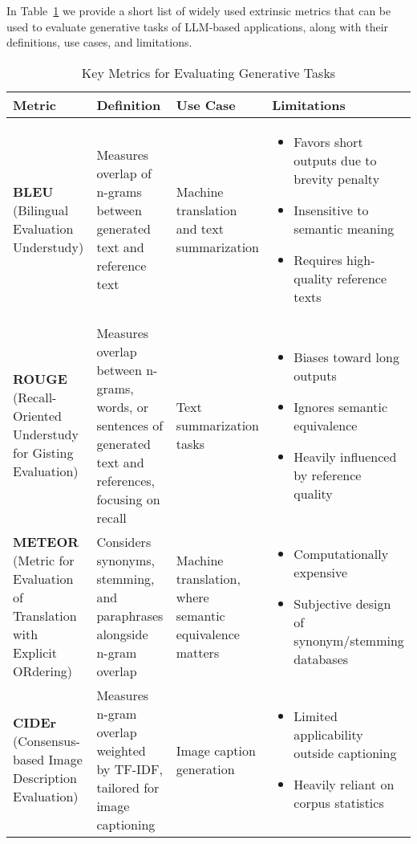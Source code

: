 In Table~\ref{tab:key-metrics} we provide a short list of widely used extrinsic metrics that can be used to evaluate generative tasks of LLM-based applications, along with their definitions, use cases, and limitations.
\begin{table}[htbp]
\caption{Key Metrics for Evaluating Generative Tasks}
\label{tab:key-metrics}
\begin{tabular}{p{}p{}p{}p{}}
\hline
\textbf{Metric} & \textbf{Definition} & \textbf{Use Case} & \textbf{Limitations} \\
\hline
\textbf{BLEU} (Bilingual Evaluation Understudy) & Measures overlap of n-grams between generated text and reference text & Machine translation and text summarization & \begin{itemize}\item Favors short outputs due to brevity penalty\item Insensitive to semantic meaning\item Requires high-quality reference texts\end{itemize} \\
\hline
\textbf{ROUGE} (Recall-Oriented Understudy for Gisting Evaluation) & Measures overlap between n-grams, words, or sentences of generated text and references, focusing on recall & Text summarization tasks & \begin{itemize}\item Biases toward long outputs\item Ignores semantic equivalence\item Heavily influenced by reference quality\end{itemize} \\
\hline
\textbf{METEOR} (Metric for Evaluation of Translation with Explicit ORdering) & Considers synonyms, stemming, and paraphrases alongside n-gram overlap & Machine translation, where semantic equivalence matters & \begin{itemize}\item Computationally expensive\item Subjective design of synonym/stemming databases\end{itemize} \\
\hline
\textbf{CIDEr} (Consensus-based Image Description Evaluation) & Measures n-gram overlap weighted by TF-IDF, tailored for image captioning & Image caption generation & \begin{itemize}\item Limited applicability outside captioning\item Heavily reliant on corpus statistics\end{itemize} \\

\end{tabular}
\end{table}
